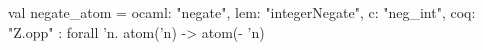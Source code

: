 val negate_atom = {ocaml: "negate", lem: "integerNegate", c: "neg_int", coq: "Z.opp"} : forall 'n. atom('n) -> atom(- 'n)
